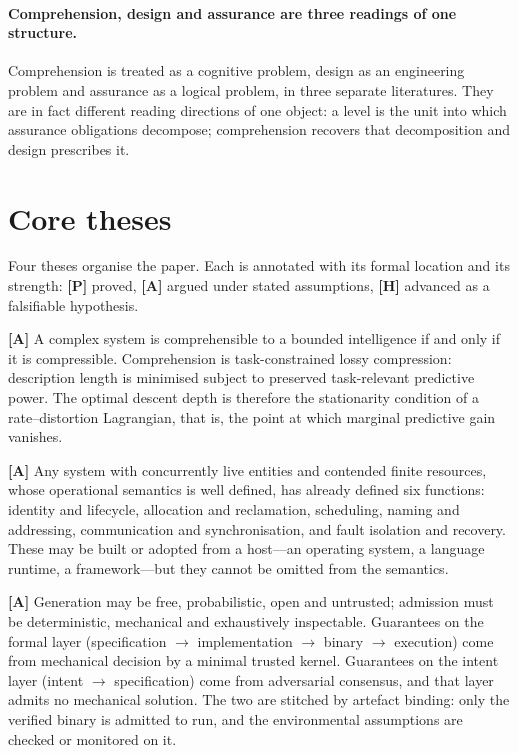 \paragraph{Comprehension, design and assurance are three readings of one structure.}
Comprehension is treated as a cognitive problem, design as an engineering problem and
assurance as a logical problem, in three separate literatures. They are in fact different
reading directions of one object: a level is the unit into which assurance obligations
decompose; comprehension recovers that decomposition and design prescribes it.

\section{Core theses}

Four theses organise the paper. Each is annotated with its formal location and its
strength: \textbf{[P]} proved, \textbf{[A]} argued under stated assumptions,
\textbf{[H]} advanced as a falsifiable hypothesis.

\begin{principle}[Compression]\label{th:compression}\textbf{[A]}
A complex system is comprehensible to a bounded intelligence if and only if it is
compressible. Comprehension is task-constrained lossy compression: description length is
minimised subject to preserved task-relevant predictive power. The optimal descent depth
is therefore the stationarity condition of a rate--distortion Lagrangian, that is, the
point at which marginal predictive gain vanishes.
\end{principle}

\begin{principle}[Necessity]\label{th:necessity}\textbf{[A]}
Any system with concurrently live entities and contended finite resources, whose
operational semantics is well defined, has already defined six functions: identity and
lifecycle, allocation and reclamation, scheduling, naming and addressing, communication
and synchronisation, and fault isolation and recovery. These may be built or adopted from
a host---an operating system, a language runtime, a framework---but they cannot be omitted
from the semantics.
\end{principle}

\begin{principle}[Separation]\label{th:separation}\textbf{[A]}
Generation may be free, probabilistic, open and untrusted; admission must be
deterministic, mechanical and exhaustively inspectable. Guarantees on the formal layer
(specification $\to$ implementation $\to$ binary $\to$ execution) come from mechanical
decision by a minimal trusted kernel. Guarantees on the intent layer (intent $\to$
specification) come from adversarial consensus, and that layer admits no mechanical
solution. The two are stitched by artefact binding: only the verified binary is admitted
to run, and the environmental assumptions are checked or monitored on it.
\end{principle}

